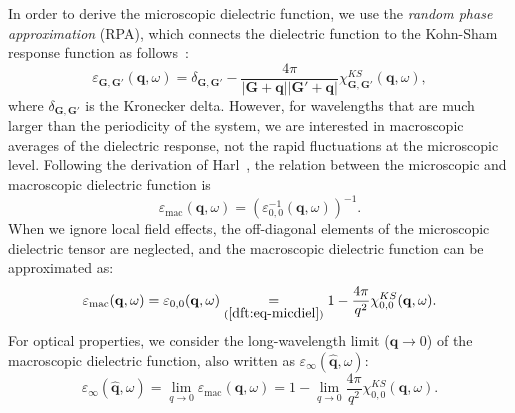 \begin{refsection}
In order to derive the microscopic dielectric function, we use the 
\textit{random phase approximation} (RPA), which connects the dielectric 
function to the Kohn-Sham response function as follows~\cite{Harl2008}: 
\begin{equation}\label{dft:eq-micdiel} 
\varepsilon_{\mathbf{G},\mathbf{G}'}(\mathbf{q},\omega) = 
\delta_{\mathbf{G},\mathbf{G}'} - \frac{4 \pi}{|\mathbf{G} + \mathbf{q}| 
|\mathbf{G}' + \mathbf{q}|} 
\chi_{\mathbf{G},\mathbf{G}'}^{KS}(\mathbf{q},\omega), 
\end{equation} 
where $\delta_{\mathbf{G},\mathbf{G}'}$ is the Kronecker delta. However, for
wavelengths that are much larger than the periodicity of the system, we are 
interested in macroscopic averages of the dielectric response, not the rapid 
fluctuations at the microscopic level. Following the derivation of 
Harl~\cite{Harl2008}, the relation between the microscopic and macroscopic 
dielectric function is
\begin{equation}
\varepsilon_{\text{mac}}(\mathbf{q}, \omega) = 
(\varepsilon_{0,0}^{-1}(\mathbf{q}, \omega))^{-1}.
\end{equation}
When we ignore local field effects, the off-diagonal elements of the 
microscopic dielectric tensor are neglected, and the macroscopic dielectric 
function can be approximated as: 
\begin{equation} 
\varepsilon_{\text{mac}}(\mathbf{q}, \omega) = \varepsilon_{0,0}(\mathbf{q}, \omega) 
\underset{(\ref{dft:eq-micdiel})}{=} 1 - \frac{4 
\pi}{q^2} \chi_{0,0}^{KS}(\mathbf{q},\omega). 
\end{equation} 
For optical properties, we consider the long-wavelength limit ($\mathbf{q} 
\rightarrow 0$) of the macroscopic dielectric function, also written as 
$\varepsilon_\infty (\mathbf{\hat{q}}, \omega)$:
\begin{equation}
\varepsilon_\infty (\mathbf{\hat{q}}, \omega) = \lim_{q \rightarrow 0} 
\varepsilon_{\text{mac}}(\mathbf{q}, \omega) =  1 - \lim_{q \rightarrow 0} 
\frac{4 \pi}{q^2} \chi_{0,0}^{KS}(\mathbf{q},\omega). 
\end{equation}


\end{refsection}
